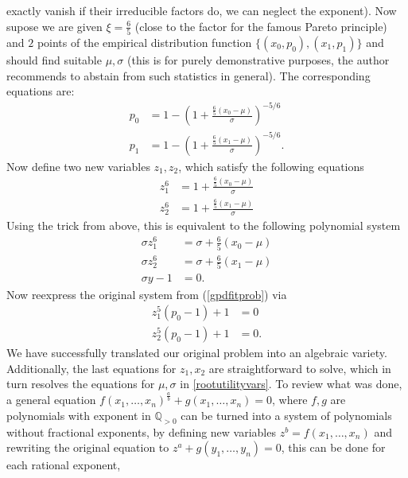 \begin{example}
    exactly vanish if their irreducible factors do, we can neglect the exponent).
    \newline
    \newline
    Now supose we are given \( \xi = \frac{6}{5} \) (close to the factor for the famous Pareto principle)
    and \( 2 \) points of the empirical distribution function \( \{(x_0, p_0), (x_1, p_1)\} \) and should find suitable \( \mu, \sigma \) 
    (this is for purely demonstrative purposes, the author recommends to abstain from such statistics in general).
    The corresponding equations are:
    \begin{align} \label{gpdfitprob}
        p_0 &= 1 - \left(1+ \frac{\frac{6}{5}(x_0-\mu)}{\sigma}\right)^{-5/6} \\ 
        p_1 &= 1 - \left(1+ \frac{\frac{6}{5}(x_1-\mu)}{\sigma}\right)^{-5/6}.
    \end{align}
        Now define two new variables \( z_1, z_2 \), which satisfy the following equations 
    \begin{align} \label{rootutilityvars}
        z_1^{6} &= 1 + \frac{ \frac{6}{5} (x_0-\mu)}{\sigma} \\
        z_2^{6} &= 1 + \frac{ \frac{6}{5} (x_1-\mu)}{\sigma}
    \end{align}
    Using the trick from above, this is equivalent to the following polynomial system
    \begin{align*}
        \sigma z_1^{6} &= \sigma + \frac{6}{5} (x_0-\mu)\\ 
        \sigma z_2^{6} &= \sigma + \frac{6}{5} (x_1-\mu) \\
        \sigma y - 1 &= 0.
    \end{align*}
    Now reexpress the original system from (\ref{gpdfitprob}) via 
    \begin{align*}
        z_1^{5}(p_0 - 1) + 1 &= 0 \\ 
        z_2^{5}(p_0 - 1) + 1 &= 0.
    \end{align*}
    We have successfully translated our original problem into an algebraic variety.
    Additionally, the last equations for \( z_1, x_2 \) are straightforward to solve, which in turn
    resolves the equations for \( \mu, \sigma \) in \ref{rootutilityvars}.
    To review what was done, a general equation \( f(x_1, \dots, x_n)^\frac{a}{b} + g(x_1, \dots, x_n) = 0 \), where \( f, g \) are polynomials
    with exponent in \( \mathbb{Q}_{>0} \) can be turned into a system of polynomials without fractional exponents,
    by defining new variables \( z^b = f(x_1, \dots, x_n) \) and rewriting the original equation to \( z^a + g(y_1, \dots, y_n) = 0 \), this can be done for each rational exponent,

\end{example}
